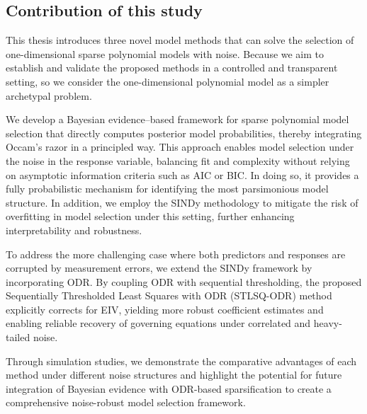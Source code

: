 \subsection{Contribution of this study}


This thesis introduces three novel model methods that can solve the selection of one-dimensional sparse polynomial models with noise. Because we aim to establish and validate the proposed methods in a controlled and transparent setting, so we consider the one-dimensional polynomial model as a simpler archetypal problem.

We develop a Bayesian evidence–based framework for sparse polynomial model selection that directly computes posterior model probabilities, thereby integrating Occam’s razor in a principled way. This approach enables model selection under the noise in the response variable, balancing fit and complexity without relying on asymptotic information criteria such as AIC or BIC. In doing so, it provides a fully probabilistic mechanism for identifying the most parsimonious model structure. 
In addition, we employ the SINDy methodology to mitigate the risk of overfitting in model selection under this setting, further enhancing interpretability and robustness.

To address the more challenging case where both predictors and responses are corrupted by measurement errors, we extend the SINDy framework by incorporating ODR. By coupling ODR with sequential thresholding, the proposed Sequentially Thresholded Least Squares with ODR (STLSQ-ODR) method explicitly corrects for EIV, yielding more robust coefficient estimates and enabling reliable recovery of governing equations under correlated and heavy-tailed noise.

Through simulation studies, we demonstrate the comparative advantages of each method under different noise structures and highlight the potential for future integration of Bayesian evidence with ODR-based sparsification to create a comprehensive noise-robust model selection framework.



